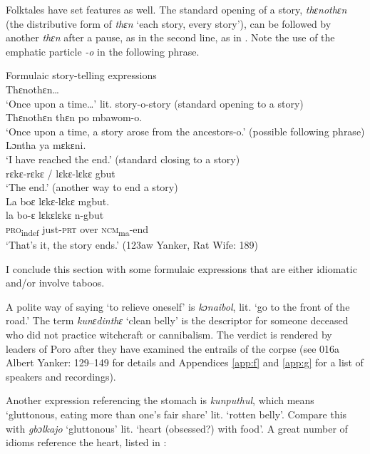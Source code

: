 Folktales have set features as well. The standard opening of a story, \textit{thɛnothɛn} (the distributive form of \textit{thɛn} ‘each story, every story'), can be followed by another \textit{thɛn} after a pause, as in the second line, as in . Note the use of the emphatic particle \textit{{}-o} in the following phrase.

\ea%
    \label{ex:248}
    Formulaic story-telling expressions\\
    
\ea Thɛnothɛn… \\
‘Once upon a time…' lit. story-o-story (standard opening to a story)\\

\ex Thɛnothɛn thɛn po mbawom-o. \\
‘Once upon a time, a story arose from the ancestors-o.' (possible following phrase)\\

\ex Lɔntha ya mɛkɛni. \\
‘I have reached the end.' (standard closing to a story)\\

\ex rɛkɛ-rɛkɛ / lɛkɛ-lɛkɛ gbut \\
‘The end.' (another way to end a story)\\
\vspace{6pt}
\ex La boɛ lɛkɛ-lɛkɛ mgbut.\\
\gll la      bo-ɛ      lɛkɛlɛkɛ    n-gbut\\
\textsc{pro}\textsubscript{indef}  just-\textsc{prt}    over      \textsc{ncm}\textsubscript{ma}\textsc{{}-}end\\
\glt ‘That's it, the story ends.' (123aw Yanker, Rat Wife: 189)
\z
\z

I conclude this section with some formulaic expressions that are either idiomatic and/or involve taboos.

A polite way of saying ‘to relieve oneself' is \textit{kɔnaibol}, lit. ‘go to the front of the road.' The term \textit{kunɛdinthɛ} ‘clean belly' is the descriptor for someone deceased who did not practice witchcraft or cannibalism. The verdict is rendered by leaders of Poro after they have examined the entrails of the corpse (see 016a Albert Yanker: 129–149 for details and Appendices \ref{app:f} and \ref{app:g} for a list of speakers and recordings).

Another expression referencing the stomach is \textit{kunputhul}, which means ‘gluttonous, eating more than one's fair share' lit. ‘rotten belly'. Compare this with \textit{gbɔlkajo} ‘gluttonous' lit. ‘heart (obsessed?) with food'. A great number of idioms reference the heart, listed in :

